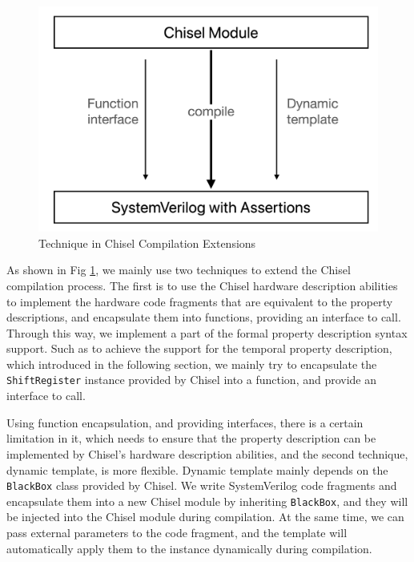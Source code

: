 \documentclass[conference]{IEEEtran}
\theoremstyle{definition}
\begin{document}
\begin{figure}[!htbp]
    \begin{center}
    \includegraphics[width=0.9\linewidth]{pics/ChiselFVSubstitute.png}
    \caption{Technique in Chisel Compilation Extensions}
    \label{fig: ChiselFVSubstitute}
    \end{center}
\end{figure}

As shown in Fig \ref{fig: ChiselFVSubstitute}, we mainly use two techniques to extend the Chisel compilation process. The first is to use the Chisel hardware description abilities to implement the hardware code fragments that are equivalent to the property descriptions, and encapsulate them into functions, providing an interface to call. Through this way, we implement a part of the formal property description syntax support.
Such as to achieve the support for the temporal property description, which introduced in the following section, we mainly try to encapsulate the \verb|ShiftRegister| instance provided by Chisel into a function, and provide an interface to call.

Using function encapsulation, and providing interfaces, there is a certain limitation in it, which needs to ensure that the property description can be implemented by Chisel's hardware description abilities, and the second technique, dynamic template, is more flexible.
Dynamic template mainly depends on the \verb|BlackBox| class provided by Chisel. We write SystemVerilog code fragments and encapsulate them into a new Chisel module by inheriting \verb|BlackBox|, and they will be injected into the Chisel module during compilation. At the same time, we can pass external parameters to the code fragment, and the template will automatically apply them to the instance dynamically during compilation.
\end{document}
